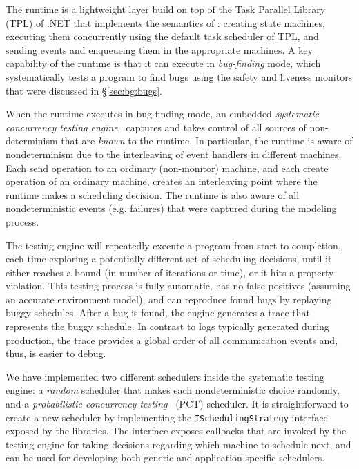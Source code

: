The \psharp runtime is a lightweight layer build on top of the Task Parallel Library (TPL) of .NET that implements the semantics of \psharp: creating state machines, executing them concurrently using the default task scheduler of TPL, and sending events and enqueueing them in the appropriate machines. A key capability of the \psharp runtime is that it can execute in \emph{bug-finding} mode, which systematically tests a \psharp program to find bugs using the safety and liveness monitors that were discussed in \S\ref{sec:bg:bugs}.

When the \psharp runtime executes in bug-finding mode, an embedded \emph{systematic concurrency testing engine}~\cite{godefroid1997verisoft, musuvathi2008finding, emmi2011delay} captures and takes control of all sources of non-determinism that are \emph{known} to the \psharp runtime. In particular, the runtime is aware of nondeterminism due to the interleaving of event handlers in different machines. Each send operation to an ordinary (non-monitor) machine, and each create operation of an ordinary machine, creates an interleaving point where the runtime makes a scheduling decision. The runtime is also aware of all nondeterministic events (e.g. failures) that were captured during the modeling process.

The \psharp testing engine will repeatedly execute a program from start to completion, each time exploring a potentially different set of scheduling decisions, until it either reaches a bound (in number of iterations or time), or it hits a property violation. This testing process is fully automatic, has no false-positives (assuming an accurate environment model), and can reproduce found bugs by replaying buggy schedules. After a bug is found, the engine generates a trace that represents the buggy schedule. In contrast to logs typically generated during production, the \psharp trace provides a global order of all communication events and, thus, is easier to debug.

We have implemented two different schedulers inside the \psharp systematic testing engine: a \emph{random} scheduler that makes each nondeterministic choice randomly, and a \emph{probabilistic concurrency testing}~\cite{burckhardt2010pct} (PCT) scheduler. It is straightforward to create a new scheduler by implementing the \texttt{ISchedulingStrategy} interface~\cite{desai2015systematic} exposed by the \psharp libraries. The interface exposes callbacks that are invoked by the \psharp testing engine for taking decisions regarding which machine to schedule next, and can be used for developing both generic and application-specific schedulers.

